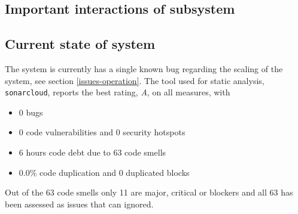 \subsection{Important interactions of subsystem}

\subsection{Current state of system}
The system is currently has a single known bug regarding the scaling of the system, see section \ref{issues-operation}. The tool used for static analysis, \texttt{sonarcloud}, reports the best rating, \textit{A}, on all measures, with 

\begin{itemize}
    \item 0 bugs
    \item 0 code vulnerabilities and 0 security hotspots
    \item 6 hours code debt due to 63 code smells
    \item 0.0\% code duplication and 0 duplicated blocks
\end{itemize}

Out of the 63 code smells only 11 are major, critical or blockers and all 63 has been assessed as issues that can ignored.


